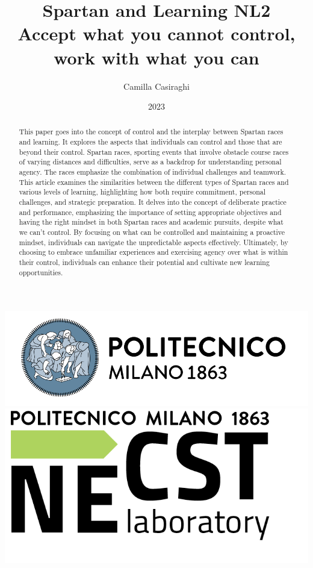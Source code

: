 \documentclass[12pt,oneside,a4paper]{article}
\title{\textbf{Spartan and Learning NL2 \\ Accept what you cannot control, work with what you can}}
\author{Camilla Casiraghi}
\date{2023}
\begin{document}
\begin{titlepage}
	\centering
	\clearpage
	\maketitle
	\thispagestyle{empty}
	\vspace*{1cm}
	\vfill
	\centering
	\includegraphics{logo_polimi.png}\includegraphics{logo_NECST.png}
\end{titlepage}


\begin{abstract}
This paper goes into the concept of control and the interplay between Spartan races and learning. It explores the aspects that individuals can control and those that are beyond their control. Spartan races, sporting events that involve obstacle course races of varying distances and difficulties, serve as a backdrop for understanding personal agency. The races emphasize the combination of individual challenges and teamwork. This article examines the similarities between the different types of Spartan races and various levels of learning, highlighting how both require commitment, personal challenges, and strategic preparation. It delves into the concept of deliberate practice and performance, emphasizing the importance of setting appropriate objectives and having the right mindset in both Spartan races and academic pursuits, despite what we can't control. By focusing on what can be controlled and maintaining a proactive mindset, individuals can navigate the unpredictable aspects effectively. Ultimately, by choosing to embrace unfamiliar experiences and exercising agency over what is within their control, individuals can enhance their potential and cultivate new learning opportunities.
\end{abstract}
\end{document}
